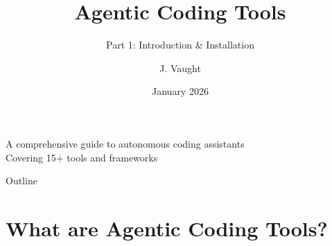 \documentclass[aspectratio=169,11pt]{beamer}
\title[Agentic Coding Tools]{Agentic Coding Tools}
\subtitle{Part 1: Introduction \& Installation}
\author{J. Vaught}
\institute{University of South Carolina}
\date{January 2026}
\begin{document}
\begin{frame}[plain]
    \titlepage
    \begin{center}
        \small A comprehensive guide to autonomous coding assistants\\
        Covering 15+ tools and frameworks
    \end{center}
\end{frame}

\begin{frame}{Outline}
    \tableofcontents
\end{frame}

\section{What are Agentic Coding Tools?}
\end{document}
